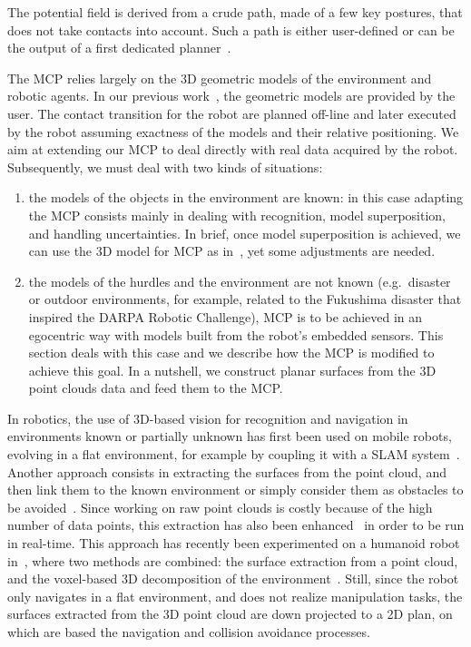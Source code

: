 The potential field is derived from a crude path, made of a few key postures, that does not take contacts into account.
Such a path is either user-defined or can be the output of a first dedicated planner~\cite{bouyarmane:icra:2009}.

The MCP relies largely on the 3D geometric models of the environment and robotic agents.
In our previous work~\cite{escande:ras:2013,bouyarmane:ar:2012}, the geometric models are provided by the user.
The contact transition for the robot are planned off-line and later executed by the robot assuming exactness of the models and their relative positioning.
We aim at extending our MCP to deal directly with real data acquired by the robot.
Subsequently, we must deal with two kinds of situations:
\begin{enumerate}
  \item the models of the objects in the environment are known: in this case adapting the MCP consists mainly in dealing with recognition, model superposition, and handling uncertainties.
  In brief, once model superposition is achieved, we can use the 3D model for MCP as in~\cite{escande:ras:2013,bouyarmane:ar:2012}, yet some adjustments are needed.
  \item the models of the hurdles and the environment are not known (e.g.\ disaster or outdoor environments, for example, related to the Fukushima disaster that inspired the DARPA Robotic Challenge), MCP is to be achieved in an egocentric way with models built from the robot's embedded sensors.
  This section deals with this case and we describe how the MCP is modified to achieve this goal.
  In a nutshell, we construct planar surfaces from the 3D point clouds data and feed them to the MCP.\@
\end{enumerate}

In robotics, the use of 3D-based vision for recognition and navigation in environments known or partially unknown has first been used on mobile robots, evolving in a flat environment, for example by coupling it with a SLAM system~\cite{whitty:acra:2012}.
Another approach consists in extracting the surfaces from the point cloud, and then link them to the known environment or simply consider them as obstacles to be avoided~\cite{poppinga:iros:2008}.
Since working on raw point clouds is costly because of the high number of data points, this extraction has also been enhanced~\cite{biswas:icra:2012} in order to be run in real-time.
This approach has recently been experimented on a humanoid robot in~\cite{maier:humanoids:2012}, where two methods are combined: the surface extraction from a point cloud, and the voxel-based 3D decomposition of the environment~\cite{nakhaei:humanoids:2008}.
Still, since the robot only navigates in a flat environment, and does not realize manipulation tasks, the surfaces extracted from the 3D point cloud are down projected to a 2D plan, on which are based the navigation and collision avoidance processes.

